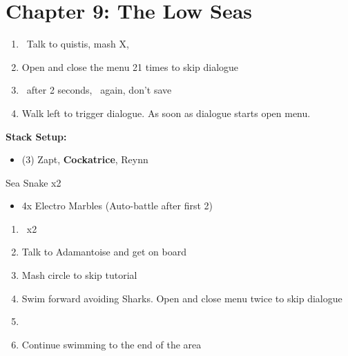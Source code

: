 \chapter{Chapter 9: The Low Seas}
\begin{enumerate}
	\item \cs\, Talk to quistis, mash X, \cs
	\item Open and close the menu 21 times to skip dialogue
	\item \cs\ after 2 seconds, \cs\ again, don't save
	\item Walk left to trigger dialogue. As soon as dialogue starts open menu.
\end{enumerate}
\begin{menu}
\textbf{Stack Setup:}
	\begin{itemize}
		\item (3) Zapt, \textbf{Cockatrice}, Reynn
	\end{itemize}
\end{menu}
\begin{battle}[]{Sea Snake x2}
	\begin{itemize}
		\item 4x Electro Marbles (Auto-battle after first 2)
	\end{itemize}
\end{battle}
\begin{enumerate}[resume]
	\item \cs\ x2
	\item Talk to Adamantoise and get on board
	\item Mash circle to skip tutorial
	\item Swim forward avoiding Sharks. Open and close menu twice to skip dialogue
	\item \cs
	\item Continue swimming to the end of the area
\end{enumerate}